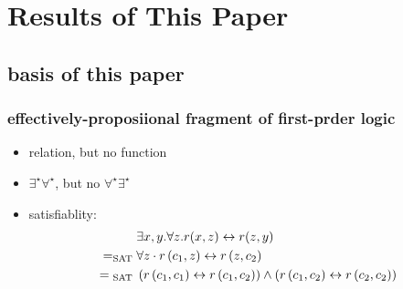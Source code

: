 \section{Results of This Paper}
\subsection{basis of this paper}
\begin{frame}
    \frametitle{effectively-proposiional fragment of first-prder logic}
    \begin{itemize}
        \item relation, but no function
        \item $\exists^{\star} \forall ^{\star}$, but no $\forall^{\star} \exists ^{\star}$
        \item satisfiablity:
        \begin{align}
            &\exists x, y . \forall z . r(x, z) \leftrightarrow r(z, y) \notag\\
            = _{\text {SAT }}& \forall z \cdot r\left(c_{1}, z\right) \leftrightarrow r\left(z, c_{2}\right) \notag\\
            = { }_{\text {SAT }}&\left(r\left(c_{1}, c_{1}\right) \leftrightarrow r\left(c_{1}, c_{2}\right)\right) \wedge\left(r\left(c_{1}, c_{2}\right) \leftrightarrow r\left(c_{2}, c_{2}\right)\right)
        \end{align}
    \end{itemize}
\end{frame}
